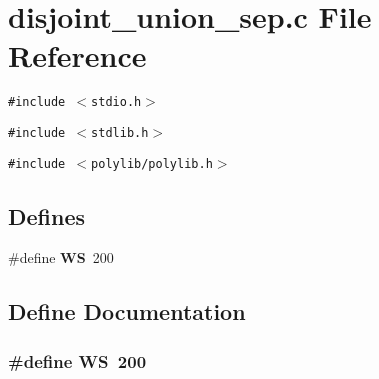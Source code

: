 \section{disjoint\_\-union\_\-sep.c File Reference}
\label{disjoint__union__sep_8c}
{\tt \#include $<$stdio.h$>$}\par
{\tt \#include $<$stdlib.h$>$}\par
{\tt \#include $<$polylib/polylib.h$>$}\par
\subsection*{Defines}
\begin{CompactItemize}
\item 
\#define {\bf WS}\ 200
\end{CompactItemize}


\subsection{Define Documentation}
\subsubsection{\setlength{\rightskip}{0pt plus 5cm}\#define WS\ 200}\label{disjoint__union__sep_8c_a0}


